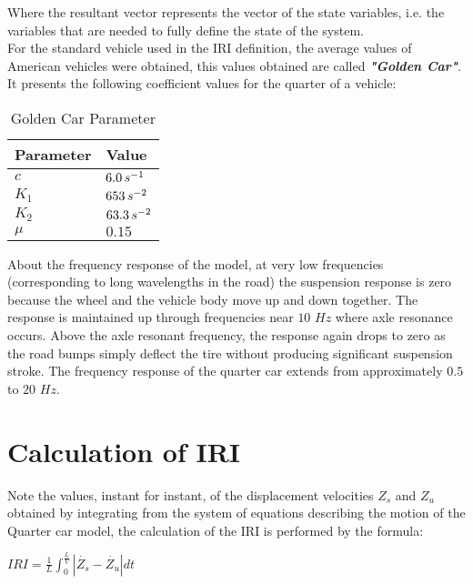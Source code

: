 \documentclass[tesi]{subfiles}
\begin{document}
\noindent Where the resultant vector represents the vector of the state variables, i.e. the variables that are needed to fully define the state of the system. \\For the standard vehicle used in the IRI definition, the average values of American vehicles were obtained, this values obtained are called \textbf{\textit{"Golden Car"}}\cite{little_book}.
It presents the following coefficient values for the quarter of a vehicle:


\begin{table}[ht]\label{table:Golden Car Parameter}
\centering
    \begin{tabular}{ | l | l |}

    \hline
    Parameter  & Value \\ \hline


    $c$ & $6.0 \thinspace s^{-1}$\\ \hline
    $K_{1}$ & $653 \thinspace s^{-2}$\\ \hline
    $K_{2}$ & $63.3 \thinspace s^{-2}$\\ \hline
    $\mu$ & $0.15$\\ \hline

\hline
    \end{tabular}
 \caption{Golden Car Parameter}
\end{table}

\noindent About the frequency response of the model, at very low frequencies (corresponding to long wavelengths in the road) the suspension response is zero because the wheel and the vehicle body move up and down together. The response is maintained up through frequencies near $10$ $Hz$ where axle resonance occurs. Above the axle resonant frequency, the response again drops to zero as the road bumps simply deflect the tire without producing significant suspension stroke.
The frequency response of the quarter car extends from approximately $0.5$ to $20$ $Hz$.

\section{Calculation of IRI}\label{sc:Calculation of IRI}
Note the values, instant for instant, of the displacement velocities $Z_{s}$  and $Z_{u}$ obtained by integrating from the system of equations describing the motion of the Quarter car model, the calculation of the IRI is performed by the formula:
\begin{center}
{\LARGE $IRI = \frac{1}{L} \int_{0}^{\frac{L}{V}} | \dot{Z_{s}} - \dot{Z_{u}} | dt$}
\end{center}
\end{document}
